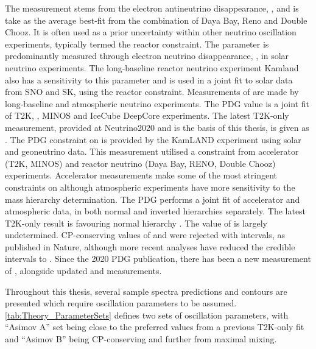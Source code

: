The  measurement stems from the electron antineutrino disappearance, , and is take as the  average best-fit from the combination of Daya Bay, Reno and Double Chooz. It is often used as a prior uncertainty within other neutrino oscillation experiments, typically termed the reactor constraint. The  parameter is predominantly measured through electron neutrino disappearance, , in solar neutrino experiments. The long-baseline reactor neutrino experiment Kamland also has a sensitivity to this parameter and is used in a joint fit to solar data from SNO and SK, using the reactor constraint. Measurements of  are made by long-baseline and atmospheric neutrino experiments. The PDG value is a joint fit of T2K, , MINOS and IceCube DeepCore experiments. The latest T2K-only measurement, provided at Neutrino2020 and is the basis of this thesis, is given as  \cite{Dunne2020-uf}. The PDG constraint on  is provided by the KamLAND experiment using solar and geoneutrino data. This measurement utilised a  constraint from accelerator (T2K, MINOS) and reactor neutrino (Daya Bay, RENO, Double Chooz) experiments. Accelerator measurements make some of the most stringent constraints on  although atmospheric experiments have more sensitivity to the mass hierarchy determination. The PDG performs a joint fit of accelerator and atmospheric data, in both normal and inverted hierarchies separately. The latest T2K-only result is  favouring normal hierarchy \cite{Dunne2020-uf}. The value of  is largely undetermined. CP-conserving values of  and \quickmath{\pi} were rejected with \quickmath{\sim 2\sigma} intervals, as published in Nature, although more recent analyses have reduced the credible intervals to . Since the 2020 PDG publication, there has been a new measurement of  \cite{Workman:2022ynf}, alongside updated  and  measurements.

Throughout this thesis, several sample spectra predictions and contours are presented which require oscillation parameters to be assumed. \autoref{tab:Theory_ParameterSets} defines two sets of oscillation parameters, with ``Asimov A'' set being close to the preferred values from a previous T2K-only fit \cite{PhysRevLett.112.181801} and ``Asimov B'' being CP-conserving and further from maximal  mixing.

